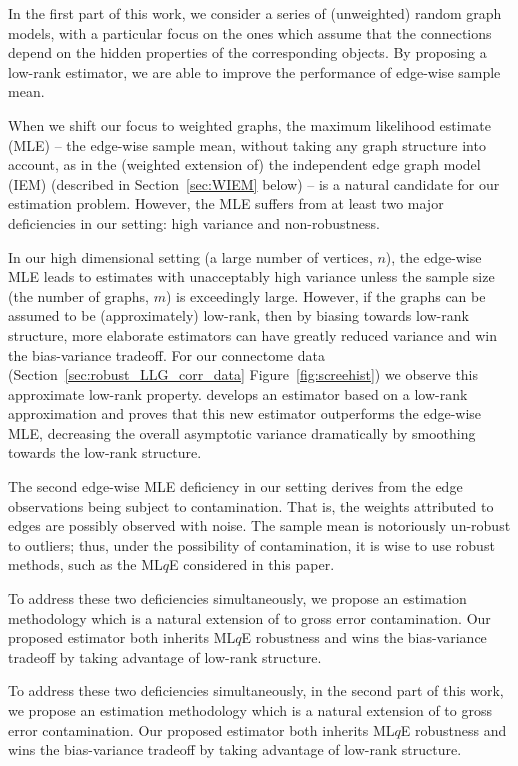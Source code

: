 In the first part of this work, we consider a series of (unweighted) random graph models, with a particular focus on the ones which assume that the connections depend on the hidden properties of the corresponding objects. By proposing a low-rank estimator, we are able to improve the performance of edge-wise sample mean.




When we shift our focus to weighted graphs, 
the maximum likelihood estimate (MLE) -- the edge-wise sample mean, without taking any graph structure into account, as in the (weighted extension of) the independent edge graph model (IEM) \citep{bollobas2007phase} (described in Section~\ref{sec:WIEM} below) --
is a natural candidate for our estimation problem. However, the MLE suffers from at least two major deficiencies in our setting: high variance and non-robustness.

In our high dimensional setting (a large number of vertices, $n$), the edge-wise MLE leads to  estimates with unacceptably high variance unless the sample size (the number of graphs, $m$) is exceedingly large.
However, if the graphs can be assumed to be (approximately) low-rank, then by biasing towards low-rank structure, more elaborate estimators can have greatly reduced variance and win the bias-variance tradeoff.
For our connectome data (Section~\ref{sec:robust_LLG_corr_data} Figure~\ref{fig:screehist})
we observe this approximate low-rank property. \citet{tang2016law} develops an estimator based on a low-rank approximation and proves that this new estimator outperforms the edge-wise MLE, decreasing the overall asymptotic variance dramatically by smoothing towards the low-rank structure.

The second edge-wise MLE deficiency in our setting derives from the edge observations being subject to contamination. That is, the weights attributed to edges are possibly observed with noise.
The sample mean is notoriously un-robust to outliers; thus, under the possibility of contamination, it is wise to use robust methods, such as the ML$q$E \citep{ferrari2010maximum, qin2013maximum} considered in this paper.

To address these two deficiencies simultaneously, we propose an estimation methodology which is a natural extension of \citep{tang2016law} to gross error contamination. Our proposed estimator both inherits ML$q$E robustness and wins the bias-variance tradeoff by taking advantage of low-rank structure.

To address these two deficiencies simultaneously, in the second part of this work, we propose an estimation methodology which is a natural extension of \citep{tang2016law} to gross error contamination. Our proposed estimator both inherits ML$q$E robustness and wins the bias-variance tradeoff by taking advantage of low-rank structure.


